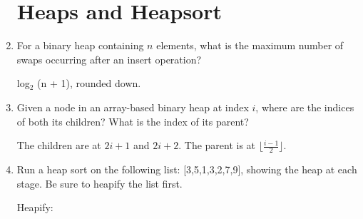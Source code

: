 \documentclass[11pt]{article}
\newenvironment{answer}{\large\lstset{basicstyle=\large}\color{white}}{}
\newenvironment{answer}{\large\lstset{basicstyle=\large}\color{red}}{}
\begin{document}
\begin{enumerate}
\section*{Heaps and Heapsort}

\item For a binary heap containing $n$ elements, what is the maximum number of
      swaps occurring after an insert operation?

    \begin{answer}
        log$_{\textrm{2}}$ (n + 1), rounded down.
    \end{answer}

\item Given a node in an array-based binary heap at index $i$, where are the
      indices of both its children? What is the index of its parent?

    \begin{answer}
    The children are at $2i+1$ and $2i+2$. The parent is at
    $\lfloor\frac{i-1}{2}\rfloor$.

    \end{answer}

\item Run a heap sort on the following list: [3,5,1,3,2,7,9], showing the heap
      at each stage. Be sure to heapify the list first.

    \begin{answer}
        Heapify:  \newline
        	[\underline{3}, 5, 1, 3, 2, 7, 9]       \newline 
    	

\end{answer}
\end{enumerate}
\end{document}
